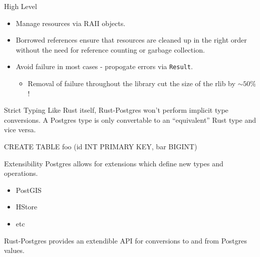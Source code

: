 \documentclass{beamer}
\begin{document}
\begin{frame}[fragile]{High Level}
    \begin{itemize}
        \item Manage resources via RAII objects.
        \item Borrowed references ensure that resources are cleaned up in the right order without the need for reference counting or garbage collection.
        \item Avoid failure in most cases - propogate errors via \verb!Result!.
        \begin{itemize}
            \item Removal of failure throughout the library cut the size of the rlib by $\sim50\%$!
        \end{itemize}
    \end{itemize}
\end{frame}

\begin{frame}[fragile]{Strict Typing}
    Like Rust itself, Rust-Postgres won't perform implicit type conversions. A
    Postgres type is only convertable to an ``equivalent'' Rust type and vice
    versa.
    \begin{sqlcode}
CREATE TABLE foo (id INT PRIMARY KEY, bar BIGINT) 
    \end{sqlcode}
\end{frame}

\begin{frame}{Extensibility}
    Postgres allows for extensions which define new types and operations.
    \begin{itemize}
        \item PostGIS
        \item HStore
        \item etc
    \end{itemize}

    Rust-Postgres provides an extendible API for conversions to and from
    Postgres values.
\end{frame}
\end{document}
